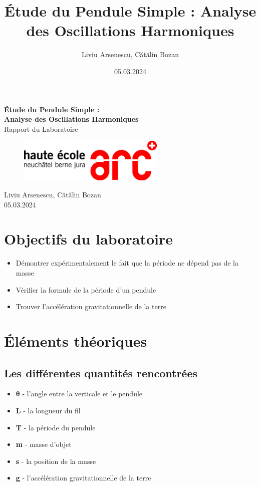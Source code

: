 \documentclass[12pt,a4paper]{article}
\title{Étude du Pendule Simple : Analyse des Oscillations Harmoniques}
\author{Liviu Arsenescu, Cătălin Bozan}
\date{05.03.2024}
\begin{document}
    \begin{titlepage}
        \begin{center}
            \vspace*{\fill}
            \Huge \textbf{Étude du Pendule Simple :} \\
            \Huge \textbf{Analyse des Oscillations Harmoniques} \\
            \Large Rapport du Laboratoire \\
            \begin{figure}[h]
                \centering
                \includegraphics[width=7cm]{hearclogo.png}
            \end{figure}
            \vspace{\fill}
            \Large Liviu Arsenescu, Cătălin Bozan \\
            05.03.2024

            \vspace*{\fill}
        \end{center}
    \end{titlepage}

    \thispagestyle{empty}
    \tableofcontents
    \newpage

    \section{Objectifs du laboratoire}
    \begin{itemize}
        \item Démontrer expérimentalement le fait que la période ne dépend pas de la masse
        \item Vérifier la formule de la période d'un pendule
        \item Trouver l'accélération gravitationnelle de la terre
    \end{itemize}

    \section{Éléments théoriques}
    \subsection{Les différentes quantités rencontrées}
    \begin{itemize}
        \item $\bm{\theta}$ - l'angle entre la verticale et le pendule
        \item \textbf{L} - la longueur du fil
        \item \textbf{T} - la période du pendule
        \item \textbf{m} - masse d'objet
        \item \textbf{s} - la position de la masse
        \item \textbf{g} - l'accélération gravitationnelle de la terre
    \end{itemize}
\end{document}
